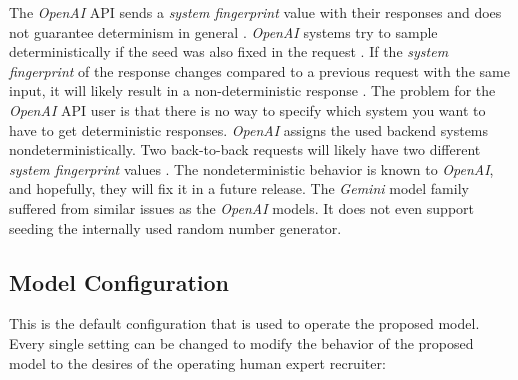\documentclass[draft,final]{thesisclass} %
\begin{document}
The \textit{OpenAI} API sends a \textit{system fingerprint} value with their responses and does not guarantee determinism in general \parencite{openai_chat_api}.
\textit{OpenAI} systems try to sample deterministically if the seed was also fixed in the request \parencite{openai_chat_api}.
If the \textit{system fingerprint} of the response changes compared to a previous request with the same input, it will likely result in a non-deterministic response \parencite{openai_chat_api}.
The problem for the \textit{OpenAI} API user is that there is no way to specify which system you want to have to get deterministic responses. \textit{OpenAI} assigns the used backend systems nondeterministically. Two back-to-back requests will likely have two different \textit{system fingerprint} values \parencite{openai_chat_api}.
The nondeterministic behavior is known to \textit{OpenAI}, and hopefully, they will fix it in a future release.
The \textit{Gemini} model family suffered from similar issues as the \textit{OpenAI} models. It does not even support seeding the internally used random number generator.

\subsection{Model Configuration} \label{model_configuration}
This is the default configuration that is used to operate the proposed model. Every single setting can be changed to modify the behavior of the proposed model to the desires of the operating human expert recruiter:

\end{document}
